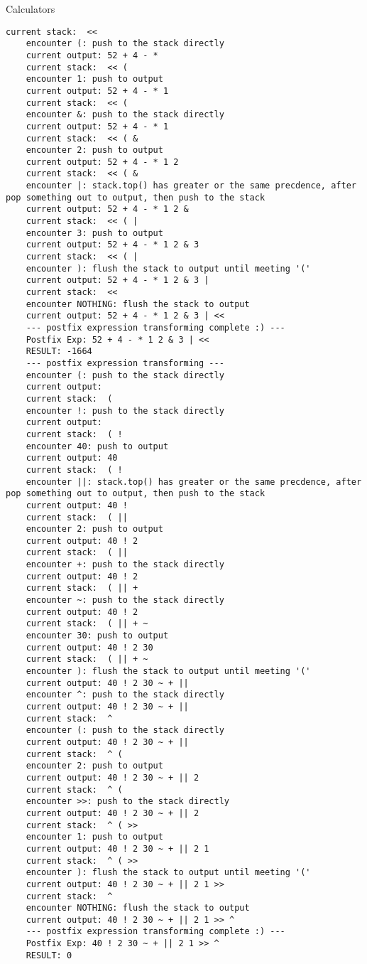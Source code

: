 \begin{homeworkProblem}{Calculators}
\begin{lstlisting}[breaklines=true]
    current stack:  <<
    encounter (: push to the stack directly
    current output: 52 + 4 - *
    current stack:  << (
    encounter 1: push to output
    current output: 52 + 4 - * 1
    current stack:  << (
    encounter &: push to the stack directly
    current output: 52 + 4 - * 1
    current stack:  << ( &
    encounter 2: push to output
    current output: 52 + 4 - * 1 2
    current stack:  << ( &
    encounter |: stack.top() has greater or the same precdence, after pop something out to output, then push to the stack
    current output: 52 + 4 - * 1 2 &
    current stack:  << ( |
    encounter 3: push to output
    current output: 52 + 4 - * 1 2 & 3
    current stack:  << ( |
    encounter ): flush the stack to output until meeting '('
    current output: 52 + 4 - * 1 2 & 3 |
    current stack:  <<
    encounter NOTHING: flush the stack to output
    current output: 52 + 4 - * 1 2 & 3 | <<
    --- postfix expression transforming complete :) ---
    Postfix Exp: 52 + 4 - * 1 2 & 3 | <<
    RESULT: -1664
    --- postfix expression transforming ---
    encounter (: push to the stack directly
    current output:
    current stack:  (
    encounter !: push to the stack directly
    current output:
    current stack:  ( !
    encounter 40: push to output
    current output: 40
    current stack:  ( !
    encounter ||: stack.top() has greater or the same precdence, after pop something out to output, then push to the stack
    current output: 40 !
    current stack:  ( ||
    encounter 2: push to output
    current output: 40 ! 2
    current stack:  ( ||
    encounter +: push to the stack directly
    current output: 40 ! 2
    current stack:  ( || +
    encounter ~: push to the stack directly
    current output: 40 ! 2
    current stack:  ( || + ~
    encounter 30: push to output
    current output: 40 ! 2 30
    current stack:  ( || + ~
    encounter ): flush the stack to output until meeting '('
    current output: 40 ! 2 30 ~ + ||
    encounter ^: push to the stack directly
    current output: 40 ! 2 30 ~ + ||
    current stack:  ^
    encounter (: push to the stack directly
    current output: 40 ! 2 30 ~ + ||
    current stack:  ^ (
    encounter 2: push to output
    current output: 40 ! 2 30 ~ + || 2
    current stack:  ^ (
    encounter >>: push to the stack directly
    current output: 40 ! 2 30 ~ + || 2
    current stack:  ^ ( >>
    encounter 1: push to output
    current output: 40 ! 2 30 ~ + || 2 1
    current stack:  ^ ( >>
    encounter ): flush the stack to output until meeting '('
    current output: 40 ! 2 30 ~ + || 2 1 >>
    current stack:  ^
    encounter NOTHING: flush the stack to output
    current output: 40 ! 2 30 ~ + || 2 1 >> ^
    --- postfix expression transforming complete :) ---
    Postfix Exp: 40 ! 2 30 ~ + || 2 1 >> ^
    RESULT: 0
    \end{lstlisting}


\end{homeworkProblem}
